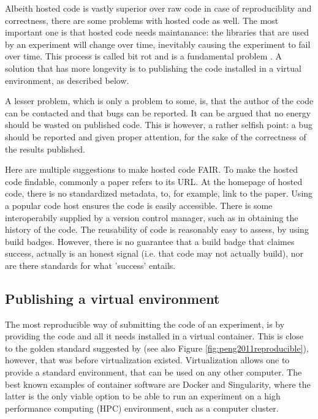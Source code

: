 
Albeith hosted code is vastly superior over raw code
in case of reproduciblity and correctness,
there are some problems with hosted code as well.
The most important one is that hosted code needs maintanance:
the libraries that are used by an experiment
will change over time, inevitably causing the experiment to fail
over time. This process is called bit rot and is a fundamental
problem . A solution that has more 
longevity is to publishing the code installed in a virtual environment,
as described below.

A lesser problem, which is only a problem to some, is, that
the author of the code can be contacted and that bugs can be reported.
It can be argued that no energy should be wasted on published code.
This is however, a rather selfish point: a bug should be reported and
given proper attention, for the sake of the correctness of the 
results published. 


Here are multiple suggestions to make hosted code FAIR.
To make the hosted code findable, commonly a paper refers to its URL.
At the homepage of hosted code, there is no standardized metadata, to,
for example, link to the paper.
Using a popular code host ensures the code is easily accessible.
There is some interoperabily supplied by a version control manager,
such as in obtaining the history of the code.
The reusability of code is reasonably easy to assess, by using build badges.
However, there is no guarantee that a build badge that claimes success,
actually is an honest signal (i.e. that code may not actually build),
nor are there standards for what 'success' entails.

\subsection{Publishing a virtual environment}

The most reproducible way of submitting the code of an experiment,
is by providing the code and all it needs 
installed in a virtual container.
This is close to the golden standard suggested by 
\cite{peng2011reproducible} (see also Figure \ref{fig:peng2011reproducible}),
however, that was before virtualization existed.
Virtualization allows one to provide a standard environment,
that can be used on any other computer.
The best known examples of container software are Docker and Singularity,
where the latter is the only viable option to be able to run
an experiment on a high performance computing (HPC) environment,
such as a computer cluster.

